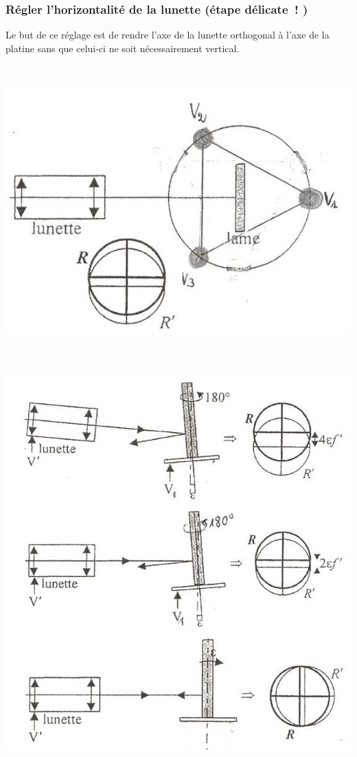 \documentclass[../main/main.tex]{subfiles}
\begin{document}
\subsubsection{Régler l'horizontalité de la lunette (étape délicate~! )}

Le but de ce réglage est de rendre l'axe de la lunette orthogonal à l'axe de la
platine sans que celui-ci ne soit nécessairement vertical.

\begin{minipage}[c]{.45\linewidth}
  ~
  \begin{center}
    \includegraphics[width=\linewidth]{reglage1}
  \end{center}
\end{minipage}
\hfill
\begin{minipage}[c]{.45\linewidth}
  ~
  \begin{center}
    \includegraphics[width=\linewidth]{reglage2}
  \end{center}
\end{minipage}
\end{document}
